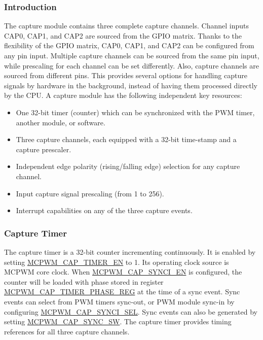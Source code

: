 \documentclass[main\_\_EN.tex]{subfiles}
\begin{document}
\subsubsection{Introduction}
The capture module contains three complete capture channels. Channel inputs CAP0, CAP1, and CAP2 are sourced from the GPIO matrix. Thanks to the flexibility of the GPIO matrix, CAP0, CAP1, and CAP2 can be configured from any pin input. Multiple capture channels can be sourced from the same pin input, while prescaling for each channel can be set differently. Also, capture channels are sourced from different pins. This provides several options for handling capture signals by hardware in the background, instead of having them processed directly by the CPU.
A capture module has the following independent key resources:
\begin{itemize}
    \item One 32-bit timer (counter) which can be synchronized with the PWM timer, another module, or software.
    \item Three capture channels, each equipped with a 32-bit time-stamp and a capture prescaler.
    \item Independent edge polarity (rising/falling edge) selection for any capture channel.
    \item Input capture signal prescaling (from 1 to 256).
    \item Interrupt capabilities on any of the three capture events.
\end{itemize}

\subsubsection{Capture Timer}
The capture timer is a 32-bit counter incrementing continuously. It is enabled by setting \hyperref[fielddesc:MCPWMCAPTIMEREN]{MCPWM\_CAP\_TIMER\_EN} to 1. Its operating clock source is MCPWM core clock. When \hyperref[fielddesc:MCPWMCAPSYNCIEN]{MCPWM\_CAP\_SYNCI\_EN} is configured, the counter will be loaded with phase stored in register\\\hyperref[regdesc:MCPWMCAPTIMERPHASEREG]{MCPWM\_CAP\_TIMER\_PHASE\_REG} at the time of a sync event. Sync events can select from PWM timers sync-out, or PWM module sync-in by configuring \hyperref[fielddesc:MCPWMCAPSYNCISEL]{MCPWM\_CAP\_SYNCI\_SEL}. Sync events can also be generated by setting \hyperref[fielddesc:MCPWMCAPSYNCSW]{MCPWM\_CAP\_SYNC\_SW}. The capture timer provides timing references for all three capture channels.
\end{document}
